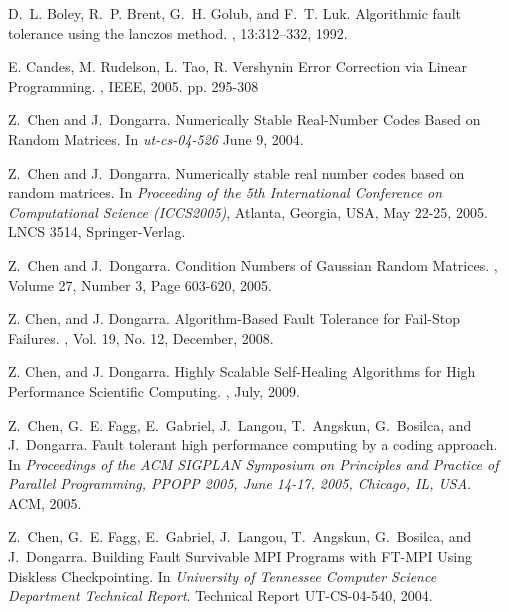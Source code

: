 \documentclass{sig-alternate}
\begin{document}
\begin{thebibliography}{14}
D.~L. Boley, R.~P. Brent, G.~H. Golub, and F.~T. Luk.
\newblock Algorithmic fault tolerance using the lanczos method.
, 13:312--332,
  1992.


E. Candes, M. Rudelson, L. Tao, R. Vershynin
\newblock Error Correction via Linear Programming.
, 
IEEE, 2005.  pp. 295-308



Z.~Chen and J.~Dongarra.
\newblock Numerically Stable Real-Number Codes Based on Random Matrices.
\newblock In {\em  ut-cs-04-526} June 9, 2004.

Z.~Chen and J.~Dongarra.
\newblock Numerically stable real number codes based on random matrices.
\newblock In {\em Proceeding of the 5th International Conference 
on Computational Science (ICCS2005)}, Atlanta, Georgia, USA, May 22-25, 2005. LNCS 3514, Springer-Verlag.

Z.~Chen and J.~Dongarra.
\newblock Condition Numbers of Gaussian Random Matrices.
, 
Volume 27, Number 3, Page 603-620, 2005.

Z. Chen, and J. Dongarra.
\newblock Algorithm-Based Fault Tolerance for Fail-Stop Failures.
,
 Vol. 19, No. 12, December, 2008.

Z. Chen, and J. Dongarra.
\newblock Highly Scalable Self-Healing Algorithms for High Performance Scientific Computing.
,
 July, 2009.

Z.~Chen, G.~E. Fagg, E.~Gabriel, J.~Langou, T.~Angskun, G.~Bosilca, and
  J.~Dongarra.
\newblock Fault tolerant high performance computing by a coding approach.
\newblock In {\em Proceedings of the ACM SIGPLAN Symposium on Principles and
  Practice of Parallel Programming, PPOPP 2005, June 14-17, 2005, Chicago, IL,
  USA}. ACM, 2005.


Z.~Chen, G.~E. Fagg, E.~Gabriel, J.~Langou, T.~Angskun, G.~Bosilca, and
  J.~Dongarra.
\newblock Building Fault Survivable MPI Programs with FT-MPI Using Diskless Checkpointing.
\newblock In {\em University of Tennessee Computer Science Department Technical Report}. 
Technical Report UT-CS-04-540, 2004.



\end{thebibliography}
\end{document}
